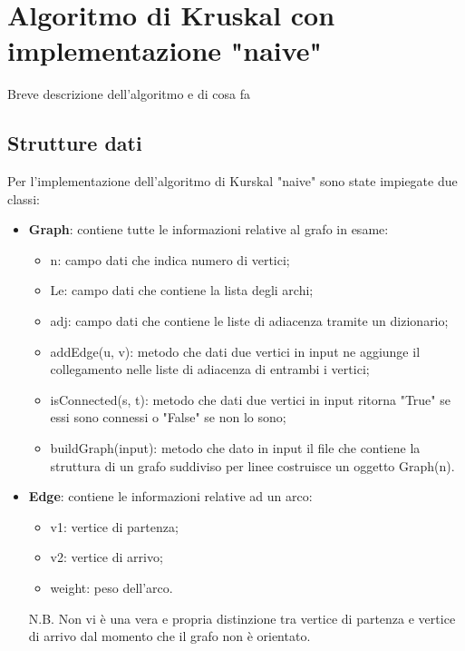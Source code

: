 \section{Algoritmo di Kruskal con implementazione "naive"}
Breve descrizione dell'algoritmo e di cosa fa

\subsection{Strutture dati}
Per l'implementazione dell'algoritmo di Kurskal "naive" sono state impiegate due classi:
\begin{itemize}
	\item \textbf{Graph}: contiene tutte le informazioni relative al grafo in esame:
	\begin{itemize}
		\item n: campo dati che indica numero di vertici;
		\item Le: campo dati che contiene la lista degli archi;
		\item adj: campo dati che contiene le liste di adiacenza tramite un dizionario;
		\item addEdge(u, v): metodo che dati due vertici in input ne aggiunge il collegamento nelle liste di adiacenza di entrambi i vertici;
		\item isConnected(s, t): metodo che dati due vertici in input ritorna "True" se essi sono connessi o "False" se non lo sono;
		\item buildGraph(input): metodo che dato in input il file che contiene la struttura di un grafo suddiviso per linee costruisce un oggetto Graph(n).
	\end{itemize} 
	\item \textbf{Edge}: contiene le informazioni relative ad un arco:
	\begin{itemize}
		\item v1: vertice di partenza;
		\item v2: vertice di arrivo;
		\item weight: peso dell'arco.
	\end{itemize}
	N.B. Non vi è una vera e propria distinzione tra vertice di partenza e vertice di arrivo dal momento che il grafo non è orientato.
\end{itemize}

